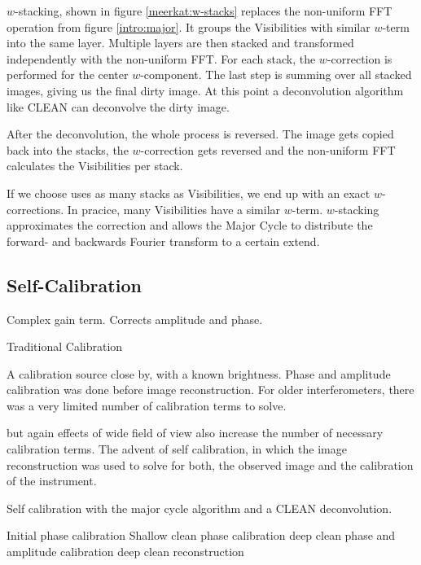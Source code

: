 $w$-stacking, shown in figure \ref{meerkat:w-stacks} replaces the non-uniform FFT operation from figure \ref{intro:major}. It groups the Visibilities with similar $w$-term into the same layer. Multiple layers are then stacked and transformed independently with the non-uniform FFT. For each stack, the $w$-correction is performed for the center $w$-component. The last step is summing over all stacked images, giving us the final dirty image. At this point a deconvolution algorithm like CLEAN can deconvolve the dirty image. 

After the deconvolution, the whole process is reversed. The image gets copied back into the stacks, the $w$-correction gets reversed and the non-uniform FFT calculates the Visibilities per stack.

If we choose uses as many stacks as Visibilities, we end up with an exact $w$-corrections. In pracice, many Visibilities have a similar $w$-term. $w$-stacking approximates the correction and allows the Major Cycle to distribute the forward- and backwards Fourier transform to a certain extend.

\subsection{Self-Calibration}
Complex gain term. Corrects amplitude and phase. 

Traditional Calibration

A calibration source close by, with a known brightness. Phase and amplitude calibration was done before image reconstruction. For older interferometers, there was a very limited number of calibration terms to solve.


but again effects of wide field of view also increase the number of necessary calibration terms. The advent of self calibration, in which the image reconstruction was used to solve for both, the observed image and the calibration of the instrument.

Self calibration with the major cycle algorithm and a CLEAN deconvolution.

Initial phase calibration
Shallow clean
phase calibration
deep clean
phase and amplitude calibration
deep clean
reconstruction






